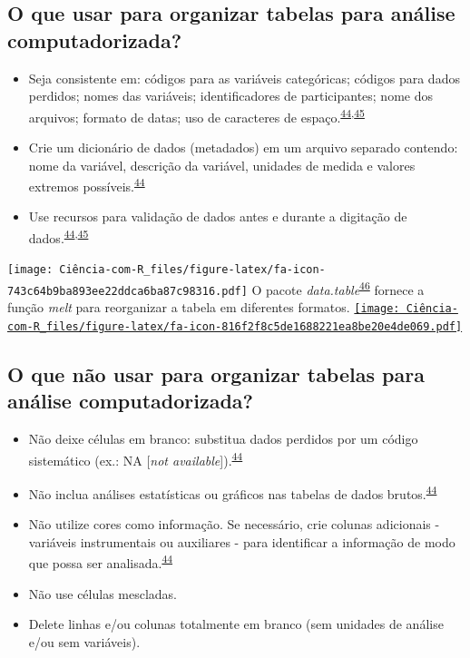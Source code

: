 \documentclass[
]{book}
\begin{document}
\hypertarget{o-que-usar-para-organizar-tabelas-para-anuxe1lise-computadorizada}{%
\subsection{O que usar para organizar tabelas para análise computadorizada?}\label{o-que-usar-para-organizar-tabelas-para-anuxe1lise-computadorizada}}

\begin{itemize}
\item
  Seja consistente em: códigos para as variáveis categóricas; códigos para dados perdidos; nomes das variáveis; identificadores de participantes; nome dos arquivos; formato de datas; uso de caracteres de espaço.\textsuperscript{\protect\hyperlink{ref-broman2018}{44},\protect\hyperlink{ref-Juluru2015}{45}}
\item
  Crie um dicionário de dados (metadados) em um arquivo separado contendo: nome da variável, descrição da variável, unidades de medida e valores extremos possíveis.\textsuperscript{\protect\hyperlink{ref-broman2018}{44}}
\item
  Use recursos para validação de dados antes e durante a digitação de dados.\textsuperscript{\protect\hyperlink{ref-broman2018}{44},\protect\hyperlink{ref-Juluru2015}{45}}
\end{itemize}

\texttt{[image: Ciência-com-R\_files/figure-latex/fa-icon-743c64b9ba893ee22ddca6ba87c98316.pdf]} O pacote \emph{data.table}\textsuperscript{\protect\hyperlink{ref-data.table}{46}} fornece a função \emph{melt} para reorganizar a tabela em diferentes formatos. \href{https://cran.r-project.org/web/packages/data.table/index.html}{\texttt{[image: Ciência-com-R\_files/figure-latex/fa-icon-816f2f8c5de1688221ea8be20e4de069.pdf]}}

\hypertarget{o-que-nuxe3o-usar-para-organizar-tabelas-para-anuxe1lise-computadorizada}{%
\subsection{O que não usar para organizar tabelas para análise computadorizada?}\label{o-que-nuxe3o-usar-para-organizar-tabelas-para-anuxe1lise-computadorizada}}

\begin{itemize}
\item
  Não deixe células em branco: substitua dados perdidos por um código sistemático (ex.: NA {[}\emph{not available}{]}).\textsuperscript{\protect\hyperlink{ref-broman2018}{44}}
\item
  Não inclua análises estatísticas ou gráficos nas tabelas de dados brutos.\textsuperscript{\protect\hyperlink{ref-broman2018}{44}}
\item
  Não utilize cores como informação. Se necessário, crie colunas adicionais - variáveis instrumentais ou auxiliares - para identificar a informação de modo que possa ser analisada.\textsuperscript{\protect\hyperlink{ref-broman2018}{44}}
\item
  Não use células mescladas.
\item
  Delete linhas e/ou colunas totalmente em branco (sem unidades de análise e/ou sem variáveis).
\end{itemize}
\end{document}
